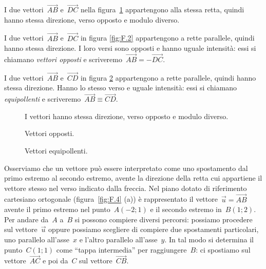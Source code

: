\begin{exrig}
\begin{esempio}
I due vettori~$\overrightarrow{AB}$ e~$\overrightarrow{DC}$ nella figura~\ref{fig:F.1} appartengono alla stessa retta, quindi hanno stessa direzione, verso opposto e modulo diverso.
\end{esempio}

\begin{esempio}
I due vettori~$\overrightarrow{AB}$ e~$\overrightarrow{DC}$ in figura \ref{fig:F.2} appartengono a rette parallele, quindi hanno stessa direzione. I loro versi sono opposti e hanno
uguale intensità: essi si chiamano \emph{vettori opposti} e scriveremo~$\overrightarrow{AB}=-\overrightarrow{DC}$.
\end{esempio}
\begin{esempio}
I due vettori~$\overrightarrow{AB}$ e~$\overrightarrow{CD}$ in figura \ref{fig:F.3} appartengono a rette parallele, quindi hanno stessa direzione. Hanno lo stesso verso e uguale intensità:
essi si chiamano \emph{equipollenti} e scriveremo~$\overrightarrow{AB}\equiv\overrightarrow{CD}$.
\end{esempio}
\end{exrig}

\begin{figure}[hb]
\centering

\caption{I vettori hanno stessa direzione, verso opposto e modulo diverso.}\label{fig:F.1}
\end{figure}

 \begin{figure}[ht]
\begin{minipage}{0.45\textwidth}
\centering

\caption{Vettori opposti.}\label{fig:F.2}
\end{minipage}\hfil
\begin{minipage}{0.45\textwidth}
\centering

\caption{Vettori equipollenti.}\label{fig:F.3}
\end{minipage}
\end{figure}

Osserviamo che un vettore può essere interpretato come uno spostamento dal primo estremo al secondo estremo, avente la direzione della retta cui appartiene il vettore stesso nel
verso indicato dalla freccia.
Nel piano dotato di riferimento cartesiano ortogonale (figura~\ref{fig:F.4} (a)) è rappresentato il vettore~$\vec{u}=\overrightarrow{AB}$ avente il primo estremo nel punto~$A(-2;1)$ e
il secondo estremo
in~$B(1;2)$. Per andare da~$A$ a~$B$ si possono compiere diversi percorsi: possiamo procedere sul vettore~$\vec{u}$ oppure possiamo scegliere di compiere due spostamenti particolari,
uno parallelo all'asse~$x$ e l'altro parallelo all'asse~$y$. In tal modo si determina il punto~$C(1;1)$ come ``tappa intermedia'' per raggiungere~$B$:
ci spostiamo sul vettore~$\overrightarrow{AC}$ e poi da~$C$ sul vettore~$\overrightarrow{CB}$.

